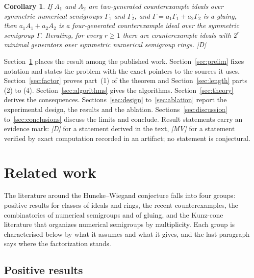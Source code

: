 \documentclass[11pt]{article}
\newtheorem{corollary}[theorem]{Corollary}
\theoremstyle{definition}
\theoremstyle{remark}
\newcommand{\mD}{\emph{[D]}}
\newcommand{\mMV}{\emph{[MV]}}
\begin{document}
\begin{corollary}\label{cor:many}
If $A_1$ and $A_2$ are two-generated counterexample ideals over symmetric numerical semigroups
$\Gamma_1$ and $\Gamma_2$, and $\Gamma=a_1\Gamma_1+a_2\Gamma_2$ is a gluing, then $a_1A_1+a_2A_2$ is a
four-generated counterexample ideal over the symmetric semigroup $\Gamma$. Iterating, for every $r\ge1$
there are counterexample ideals with $2^r$ minimal generators over symmetric numerical semigroup
rings. \mD{}
\end{corollary}

Section~\ref{sec:related} places the result among the published work. Section~\ref{sec:prelim} fixes notation and
states the problem with the exact pointers to the sources it uses. Section~\ref{sec:factor} proves part~(1) of the
theorem and Section~\ref{sec:length} parts (2) to (4). Section~\ref{sec:algorithms} gives the algorithms.
Section~\ref{sec:theory} derives the consequences. Sections~\ref{sec:design} to~\ref{sec:ablation} report the experimental design, the
results and the ablation. Sections~\ref{sec:discussion} to~\ref{sec:conclusions} discuss the limits and
conclude. Result statements carry an evidence mark: \mD{} for a statement derived in the text, \mMV{} for a statement verified by exact computation recorded in an artifact; no statement is conjectural.

\section{Related work}\label{sec:related}

The literature around the Huneke--Wiegand conjecture falls into four groups: positive results for classes of
ideals and rings, the recent counterexamples, the combinatorics of numerical semigroups and of gluing, and the
Kunz-cone literature that organizes numerical semigroups by multiplicity. Each group is characterised below by what it
assumes and what it gives, and the last paragraph says where the factorization stands.

\subsection{Positive results}
\end{document}
